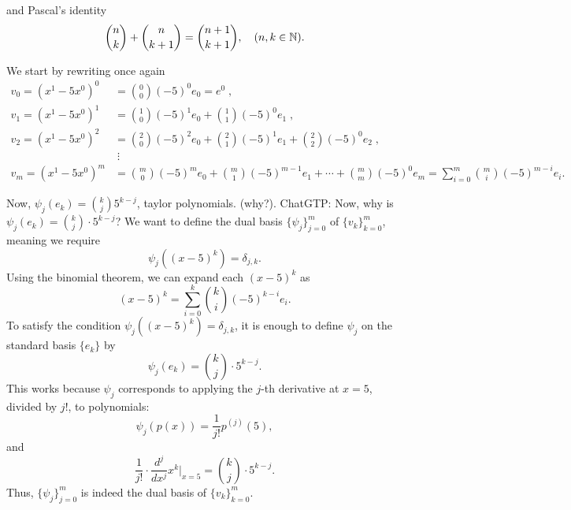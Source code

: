 \begin{xrcs}
\begin{xsol}
    and Pascal's identity
    \begin{equation}
      \binom{n}{k} + \binom{n}{k+1} = \binom{n+1}{k+1}, \quad (n,k \in \mathbb{N}).
    \end{equation}

    We start by rewriting once again
    \begin{equation}
      \begin{aligned}
        v_0 = (x^1-5x^0)^0 &= \binom{0}{0}(-5)^0 e_0 = e^0\;,\\
        v_1 = (x^1-5x^0)^1 &= \binom{1}{0}(-5)^1 e_0 + \binom{1}{1}(-5)^0 e_1 \;,\\
        v_2 = (x^1-5x^0)^2 &= \binom{2}{0}(-5)^2 e_0 + \binom{2}{1}(-5)^1 e_1 + \binom{2}{2}(-5)^0 e_2\;,\\
        & \; \vdots \\
        v_m = (x^1-5x^0  )^m &= \binom{m}{0}(-5)^m e_0 + \binom{m}{1}(-5)^{m-1} e_1 + \cdots + \binom{m}{m}(-5)^0 e_m
                           = \sum_{i=0}^{m} \binom{m}{i} (-5)^{m-i} e_{i}.
      \end{aligned}
    \end{equation}

    Now, $\psi_j(e_k) = \binom{k}{j} 5^{k-j}$, taylor polynomials. (why?).
    ChatGTP: Now, why is $\psi_j(e_k) = \binom{k}{j} \cdot 5^{k-j}$?
    We want to define the dual basis $\{\psi_j\}_{j=0}^m$ of $\{v_k\}_{k=0}^m$, meaning we require
    \[
    \psi_j((x-5)^k) = \delta_{j,k}.
    \]
    Using the binomial theorem, we can expand each $(x-5)^k$ as
    \[
    (x-5)^k = \sum_{i=0}^k \binom{k}{i} (-5)^{k-i} e_i.
    \]
    To satisfy the condition $\psi_j((x-5)^k) = \delta_{j,k}$, it is enough to define $\psi_j$ on the standard basis $\{e_k\}$ by
    \[
    \psi_j(e_k) = \binom{k}{j} \cdot 5^{k-j}.
    \]
    This works because $\psi_j$ corresponds to applying the $j$-th derivative at $x=5$, divided by $j!$, to polynomials:
    \[
    \psi_j(p(x)) = \frac{1}{j!} p^{(j)}(5),
    \]
    and
    \[
    \frac{1}{j!} \cdot \frac{d^j}{dx^j} x^k \Big|_{x=5} = \binom{k}{j} \cdot 5^{k-j}.
    \]
    Thus, $\{\psi_j\}_{j=0}^m$ is indeed the dual basis of $\{v_k\}_{k=0}^m$.
  \end{xsol}
\end{xrcs}


